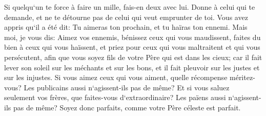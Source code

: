 \verse Si quelqu`un te force à faire un mille, fais-en deux avec lui. 
\verse Donne à celui qui te demande, et ne te détourne pas de celui qui veut emprunter de toi. 
\verse Vous avez appris qu`il a été dit: Tu aimeras ton prochain, et tu haïras ton ennemi. 
\verse Mais moi, je vous dis: Aimez vos ennemis, bénissez ceux qui vous maudissent, faites du bien à ceux qui vous haïssent, et priez pour ceux qui vous maltraitent et qui vous persécutent, 
\verse afin que vous soyez fils de votre Père qui est dans les cieux; car il fait lever son soleil sur les méchants et sur les bons, et il fait pleuvoir sur les justes et sur les injustes. 
\verse Si vous aimez ceux qui vous aiment, quelle récompense méritez-vous? Les publicains aussi n`agissent-ils pas de même? 
\verse Et si vous saluez seulement vos frères, que faites-vous d`extraordinaire? Les païens aussi n`agissent-ils pas de même? 
\verse Soyez donc parfaits, comme votre Père céleste est parfait. 

